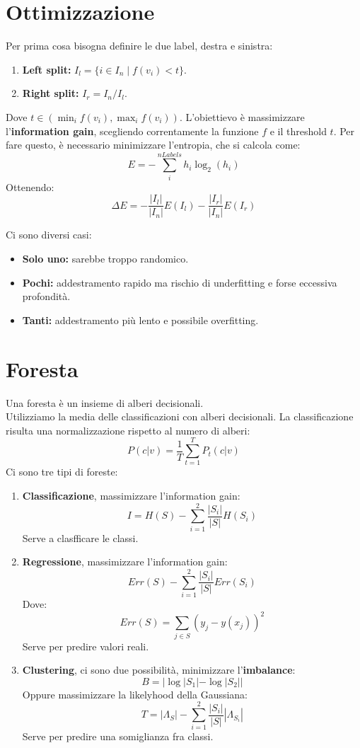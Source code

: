 \section{Ottimizzazione}
Per prima cosa bisogna definire le due label, destra e sinistra:
\begin{enumerate}
  \item \textbf{Left split:} $I_l = \{i \in I_n \mid f(v_i) < t\}$.
  \item \textbf{Right split:} $I_r = I_n / I_l$.
\end{enumerate}
Dove $t \in (\min_i f(v_i), \max_i f(v_i))$.
L'obiettievo è massimizzare l'\textbf{information gain}, scegliendo correntamente la funzione $f$ e il threshold $t$.
Per fare questo, è necessario minimizzare l'entropia, che si calcola come:
\[
  E = - \sum^{nLabels}_i{h_i \log_2{(h_i)}}
\]
Ottenendo:
\[
  \Delta E = -\frac{|I_l|}{|I_n|} E(I_l) - \frac{|I_r|}{|I_n|} E(I_r)
\]
\begin{note}
  Ci sono diversi casi:
  \begin{itemize}
    \item \textbf{Solo uno:} sarebbe troppo randomico.
    \item \textbf{Pochi:} addestramento rapido ma rischio di underfitting e forse eccessiva profondità.
    \item \textbf{Tanti:} addestramento più lento e possibile overfitting.
  \end{itemize}
\end{note}

\section{Foresta}
Una foresta è un insieme di alberi decisionali.\\
Utilizziamo la media delle classificazioni con alberi decisionali.
La classificazione risulta una normalizzazione rispetto al numero di alberi:
\[
  P(c|v) = \frac{1}{T} \sum_{t=1}^T P_t(c|v)
\]
Ci sono tre tipi di foreste:
\begin{enumerate}
  \item \textbf{Classificazione}, massimizzare l'information gain:
    \[
      I = H(S) - \sum_{i=1}^2 \frac{|S_i|}{|S|} H(S_i)
    \]
    Serve a clasfficare le classi.
  \item \textbf{Regressione}, massimizzare l'information gain:
    \[
      Err(S) - \sum_{i=1}^2 \frac{|S_i|}{|S|} Err(S_i)
    \]
    Dove:
    \[
      Err(S) = \sum_{j \in S} (y_j - y(x_j))^2
    \]
    Serve per predire valori reali.
  \item \textbf{Clustering}, ci sono due possibilità, minimizzare l'\textbf{imbalance}:
    \[
      B = |\log|S_1| - \log|S_2||
    \]
    Oppure massimizzare la likelyhood della Gaussiana:
    \[
      T = |\Lambda_S| - \sum_{i=1}^2 \frac{|S_i|}{|S|} |\Lambda_{S_i}|
    \]
    Serve per predire una somiglianza fra classi.
\end{enumerate}
